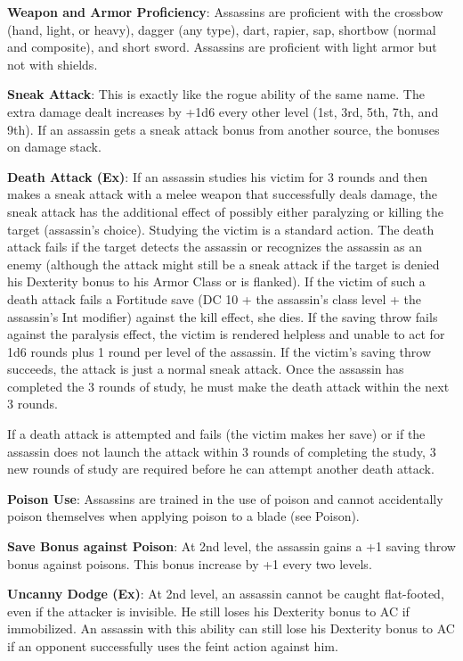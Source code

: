 \textbf{Weapon and Armor Proficiency}: Assassins are proficient with the crossbow (hand, light, or heavy), dagger (any type), dart, rapier, sap, shortbow (normal and composite), and short sword. Assassins are proficient with light armor but not with shields.
				
\textbf{Sneak Attack}: This is exactly like the rogue ability of the same name. The extra damage dealt increases by +1d6 every other level (1st, 3rd, 5th, 7th, and 9th). If an assassin gets a sneak attack bonus from another source, the bonuses on damage stack.
				
\textbf{Death Attack (Ex)}: If an assassin studies his victim for 3 rounds and then makes a sneak attack with a melee weapon that successfully deals damage, the sneak attack has the additional effect of possibly either paralyzing or killing the target (assassin's choice). Studying the victim is a standard action. The death attack fails if the target detects the assassin or recognizes the assassin as an enemy (although the attack might still be a sneak attack if the target is denied his Dexterity bonus to his Armor Class or is flanked). If the victim of such a death attack fails a Fortitude save (DC 10 + the assassin's class level + the assassin's Int modifier) against the kill effect, she dies. If the saving throw fails against the paralysis effect, the victim is rendered helpless and unable to act for 1d6 rounds plus 1 round per level of the assassin. If the victim's saving throw succeeds, the attack is just a normal sneak attack. Once the assassin has completed the 3 rounds of study, he must make the death attack within the next 3 rounds.
				
If a death attack is attempted and fails (the victim makes her save) or if the assassin does not launch the attack within 3 rounds of completing the study, 3 new rounds of study are required before he can attempt another death attack.
				
\textbf{Poison Use}: Assassins are trained in the use of poison and cannot accidentally poison themselves when applying poison to a blade (see Poison).
				
\textbf{Save Bonus against Poison}: At 2nd level, the assassin gains a +1 saving throw bonus against poisons. This bonus increase by +1 every two levels.
				
\textbf{Uncanny Dodge (Ex)}: At 2nd level, an assassin cannot be caught flat-footed, even if the attacker is invisible. He still loses his Dexterity bonus to AC if immobilized. An assassin with this ability can still lose his Dexterity bonus to AC if an opponent successfully uses the feint action against him.
				
